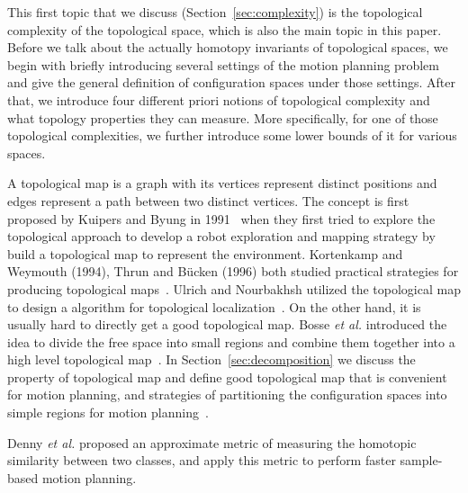 This first topic that we discuss (Section~\ref{sec:complexity}) is the topological complexity of the topological space, which is also the main topic in this paper. Before we talk about the actually homotopy invariants of topological spaces, we begin with briefly introducing several settings of the motion planning problem and give the general definition of configuration spaces under those settings. After that, we introduce four different priori notions of topological complexity and what topology properties they can measure. More specifically, for one of those topological complexities, we further introduce some lower bounds of it for various spaces.

A topological map is a graph with its vertices represent distinct positions and edges represent a path between two distinct vertices. The concept is first proposed by Kuipers and Byung in 1991~\cite{kuipers1991robot} when they first tried to explore the topological approach to develop a robot exploration and mapping strategy by build a topological map to represent the environment. Kortenkamp and Weymouth (1994), Thrun and B\"ucken (1996) both studied practical strategies for producing topological maps~\cite{kortenkamp1994topological,thrun1996learning}. Ulrich and Nourbakhsh utilized the topological map to design a algorithm for topological localization~\cite{ulrich2000appearance}. On the other hand, it is usually hard to directly get a good topological map. Bosse \emph{et al.} introduced the idea to divide the free space into small regions and combine them together into a high level topological map~\cite{bosse2003atlas}.
In Section~\ref{sec:decomposition} we discuss the property of topological map and define good topological map that is convenient for motion planning, and strategies of partitioning the configuration spaces into simple regions for motion planning~\cite{DBLP:conf/isrr/ChosetR03}.

Denny \emph{et al.} proposed an approximate metric of measuring the homotopic similarity between two classes, and apply this metric to perform faster sample-based motion planning.